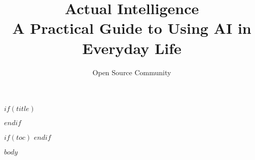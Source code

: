 \documentclass[12pt,a4paper]{book}
\title{\Huge Actual Intelligence\\\large A Practical Guide to Using AI in Everyday Life}
\author{Open Source Community}
\date{\builddate}
\begin{document}
$if(title)$
\maketitle
$endif$

$if(toc)$
\tableofcontents
\clearpage
$endif$

$body$
\end{document}
